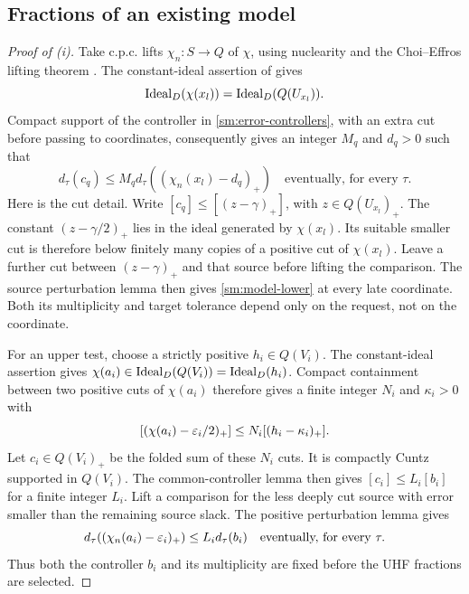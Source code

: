 \subsection{Fractions of an existing model}

\begin{proof}[Proof of \textup{(i)}]
Take c.p.c. lifts \(\chi_n:S\to Q\) of \(\chi\), using
nuclearity and the Choi--Effros lifting theorem
\cite[Theorem~3.10]{ChoiEffrosLifting}.
The constant-ideal assertion of  gives
\[
 \operatorname{Ideal}_D(\chi(x_l))=\operatorname{Ideal}_D(Q(U_{x_l})).
\]
Compact support of the controller in
\eqref{sm:error-controllers}, with an extra cut before passing
to coordinates, consequently gives an integer \(M_q\) and
\(d_q>0\) such that
\begin{equation}\label{sm:model-lower}
 d_\tau(c_q)
 \leq M_q d_\tau((\chi_n(x_l)-d_q)_+)
 \quad\text{eventually, for every }\tau.
\end{equation}
Here is the cut detail.  Write
\([c_q]\leq[(z-\gamma)_+]\), with \(z\in Q(U_{x_l})_+\).
The constant \((z-\gamma/2)_+\) lies in the ideal generated
by \(\chi(x_l)\).  Its suitable smaller cut is therefore
below finitely many copies of a positive cut of \(\chi(x_l)\).
Leave a further cut between \((z-\gamma)_+\) and that source
before lifting the comparison.  The source perturbation lemma
then gives \eqref{sm:model-lower} at every late coordinate.
Both its multiplicity and target tolerance depend only on the
request, not on the coordinate.

For an upper test, choose a strictly positive $h_i\in Q(V_i)$.
The constant-ideal assertion gives
$\chi(a_i)\in\operatorname{Ideal}_D(Q(V_i))=\operatorname{Ideal}_D(h_i)$.
Compact containment between two positive cuts of $\chi(a_i)$
therefore gives a finite integer $N_i$ and $\kappa_i>0$ with
\[
 [(\chi(a_i)-\varepsilon_i/2)_+]\leq N_i[(h_i-\kappa_i)_+].
\]
Let $c_i\in Q(V_i)_+$ be the folded sum of these $N_i$ cuts.
It is compactly Cuntz supported in $Q(V_i)$.
The common-controller lemma then gives $[c_i]\leq L_i[b_i]$
for a finite integer $L_i$.  Lift a comparison for the less deeply
cut source with error smaller than the remaining source slack.
The positive perturbation lemma gives
\begin{equation}\label{sm:model-upper}
 d_\tau((\chi_n(a_i)-\varepsilon_i)_+)
 \leq L_i d_\tau(b_i)
 \quad\text{eventually, for every }\tau.
\end{equation}
Thus both the controller $b_i$ and its multiplicity are fixed
before the UHF fractions are selected.


\end{proof}
